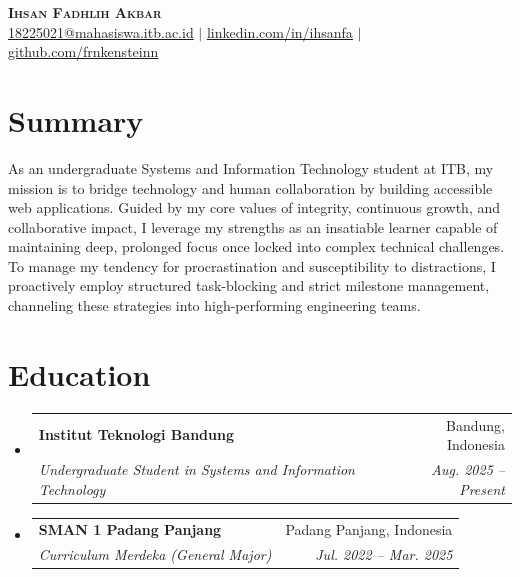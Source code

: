 \documentclass[letterpaper,11pt]{article}
\makeatletter
\newcommand{\resumeSubheading}[4]{
  \vspace{-2pt}\item
    \begin{tabular*}{0.97\textwidth}[t]{l@{\extracolsep{\fill}}r}
      \textbf{#1} & #2 \\
      \textit{\small#3} & \textit{\small #4} \\
    \end{tabular*}\vspace{-7pt}
}
\newcommand{\resumeSubHeadingListStart}{\begin{itemize}[leftmargin=0.15in, label={}]}
\newcommand{\resumeSubHeadingListEnd}{\end{itemize}}
\makeatother
\begin{document}
\begin{center}
    \textbf{\Huge \scshape Ihsan Fadhlih Akbar} \\ \vspace{1pt}
    {\underline{18225021@mahasiswa.itb.ac.id}} $|$ 
    \href{https://www.linkedin.com/in/ihsanfa/}{\underline{linkedin.com/in/ihsanfa}} $|$
    \href{https://github.com/frnkensteinn}{\underline{github.com/frnkensteinn}}
\end{center}

\section{Summary}
  \small{
    As an undergraduate Systems and Information Technology student at ITB, my mission is to bridge technology and human collaboration by building accessible web applications. Guided by my core values of integrity, continuous growth, and collaborative impact, I leverage my strengths as an insatiable learner capable of maintaining deep, prolonged focus once locked into complex technical challenges. To manage my tendency for procrastination and susceptibility to distractions, I proactively employ structured task-blocking and strict milestone management, channeling these strategies into high-performing engineering teams.
  }

\section{Education}
  \resumeSubHeadingListStart
    \resumeSubheading
      {Institut Teknologi Bandung}{Bandung, Indonesia}
      {Undergraduate Student in Systems and Information Technology}{Aug. 2025 -- Present}
    \resumeSubheading
      {SMAN 1 Padang Panjang}{Padang Panjang, Indonesia}
      {Curriculum Merdeka (General Major)}
      {Jul. 2022 -- Mar. 2025}
  \resumeSubHeadingListEnd

\end{document}
